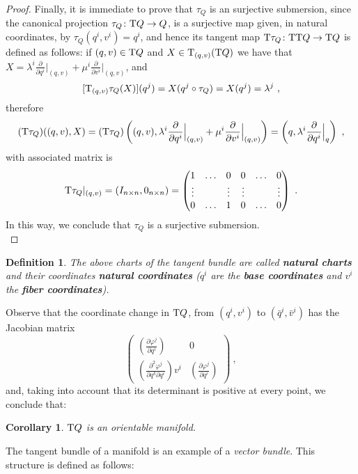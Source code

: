 \documentclass[12pt]{report}
\newtheorem{corol}[teor]{Corollary}
\newtheorem{definition}[teor]{Definition}
\def\beq{\begin{equation}}
\def\eeq{\end{equation}}
\def\dst{\displaystyle}
\def\derpar#1#2{\frac{\partial{#1}}{\partial{#2}}}
\def\qed{\ifvmode\removelastskip\fi
{\unskip\nobreak\hfil\penalty50\hbox{}\nobreak\hfil
\hbox{\vrule height1.2ex width1.2ex}\parfillskip=0pt
\finalhyphendemerits=0 \par\smallskip}}
\def\Tan{{\rm T}}
\begin{document}
\begin{appendix}
\begin{proof}
Finally, it is immediate to prove that $\tau_Q$ is an surjective submersion,
since the canonical projection 
$\tau_Q \colon \Tan Q \to Q$,
is a surjective map given, in natural coordinates, by
$\tau_Q (q^i,v^i)=q^i$, and hence its tangent map
$\Tan\tau_Q\colon\Tan\Tan Q\to\Tan Q$ is defined as follows:
if $(q,v) \in \Tan Q$ and $X \in \Tan_{(q,v)}(\Tan Q)$
we have that
\(\dst X=\lambda^i\derpar{}{q^i}\Big\vert_{(q,v)}
+\mu^i\derpar{}{v^i}\Big\vert_{(q,v)}\), and
$$
[\Tan_{(q,v)}\tau_Q (X)](q^j)=X(q^j\circ\tau_Q )=X(q^j)=\lambda^j\ ,
$$
therefore
$$
(\Tan\tau_Q )((q,v),X) =
(\Tan\tau_Q )\left( (q,v),\lambda^i\derpar{}{q^i}\Big\vert_{(q,v)}+
                  \mu^i\derpar{}{v^i}\Big\vert_{(q,v)} \right)
= \left(q,\lambda^i\derpar{}{q^i}\Big\vert_q \right) \ ,
$$
with associated matrix is
\beq
\Tan\tau_Q\vert_{(q,v)} = (I_{n\times n},0_{n\times n}) =
\left(\begin{matrix}
1 & \ldots & 0 & 0 & \ldots & 0 \\
              \vdots &  & \vdots & \vdots & & \vdots \\
              0 & \ldots & 1 & 0 & \ldots & 0\end{matrix}\right) \ .
\label{matrix1}
\eeq
In this way, we conclude that $\tau_Q$ is a surjective submersion.
\\ \qed \end{proof}

\begin{definition}
The above charts of the tangent bundle
are called \textbf{natural charts} and their coordinates \textbf{ natural coordinates}
($q^i$ are the \textbf{base coordinates}
and $v^i$ the \textbf{fiber coordinates}).
\end{definition}

Observe that the coordinate change in $\Tan Q$,
from $(q^i,v^i)$ to $(\bar q^i,\bar v^i)$ has the Jacobian matrix$$
\left(\begin{matrix}
\displaystyle\left(\derpar{\varphi^j}{q^i}\right) & 0 \\
\displaystyle\left(\frac{\partial^2\varphi^j}{\partial q^k\partial q^i}\right)v^i &
\displaystyle\left(\derpar{\varphi^j}{q^i}\right)
\end{matrix}\right) \ ,
$$
and, taking into account that its determinant is positive at every point, we conclude that:

\begin{corol}
$\Tan Q$ is an orientable manifold.
\end{corol}

The tangent bundle of a manifold is an example of a  {\sl vector bundle}.
This structure is defined as follows:


\end{appendix}
\end{document}
